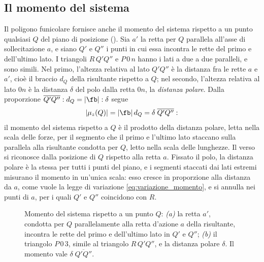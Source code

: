 \subsection{Il momento del sistema}
\label{sec:momento_sgr}

Il poligono funicolare fornisce anche il momento del sistema rispetto a un punto qualsiasi $Q$ del
piano di posizione (). Sia $a'$ la retta per $Q$ parallela all'asse di
sollecitazione $a$, e siano $Q'$ e $Q''$ i punti in cui essa incontra le rette del primo e
dell'ultimo lato. I triangoli $R\,Q'Q''$ e $P\,0\,n$ hanno i lati a due a due paralleli, e sono
simili. Nel primo, l'altezza relativa al lato $Q'Q''$ è la distanza fra le rette $a$ e $a'$, cioè
il braccio $d_Q$ della risultante rispetto a $Q$; nel secondo, l'altezza relativa al lato $0n$ è
la distanza $\delta$ del polo dalla retta $0n$, la \emph{distanza polare}. Dalla proporzione
$\overline{Q'Q''} : d_Q = |\fb| : \delta$ segue
\begin{equation}
	|\mu_z(Q)| = |\fb|\,d_Q = \delta\;\overline{Q'Q''} :
	\label{eq:momento_sgr}
\end{equation}
il momento del sistema rispetto a $Q$ è il prodotto della distanza polare, letta nella scala delle
forze, per il segmento che il primo e l'ultimo lato staccano sulla parallela alla risultante
condotta per $Q$, letto nella scala delle lunghezze. Il verso si riconosce dalla posizione di $Q$
rispetto alla retta $a$. Fissato il polo, la distanza polare è la stessa per tutti i punti del
piano, e i segmenti staccati dai lati estremi misurano il momento in un'unica scala: esso cresce
in proporzione alla distanza da $a$, come vuole la legge di variazione
\eqref{eq:variazione_momento}, e si annulla nei punti di $a$, per i quali $Q'$ e $Q''$ coincidono
con $R$.

\begin{figure}[htbp]
	\centering
	\caption{Momento del sistema rispetto a un punto $Q$: \emph{(a)} la retta $a'$, condotta per
		$Q$ parallelamente alla retta d'azione $a$ della risultante, incontra le rette del primo e
		dell'ultimo lato in $Q'$ e $Q''$; \emph{(b)} il triangolo $P\,0\,3$, simile al triangolo
		$R\,Q'Q''$, e la distanza polare $\delta$. Il momento vale $\delta\;\overline{Q'Q''}$.}
	\label{fig:momento_sgr}
\end{figure}

